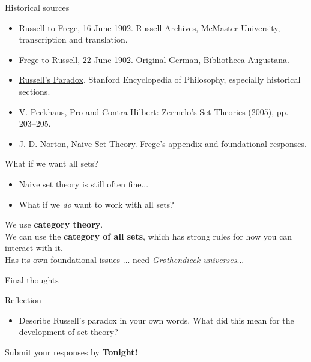 \documentclass{beamer}
\begin{document}
\begin{frame}{Historical sources}
\small
\begin{itemize}
\item \href{https://bracers.mcmaster.ca/53946}{Russell to Frege, 16 June 1902}. Russell Archives, McMaster University, transcription and translation.
\item \href{https://www.tha.de/~harsch/germanica/Chronologie/19Jh/Frege/fre_brif.html}{Frege to Russell, 22 June 1902}. Original German, Bibliotheca Augustana.
\item \href{https://plato.stanford.edu/entries/russell-paradox/}{Russell's Paradox}. Stanford Encyclopedia of Philosophy, especially historical sections.
\item \href{https://www.numdam.org/item/PHSC_2005__9_S2_199_0.pdf}{V. Peckhaus, Pro and Contra Hilbert: Zermelo's Set Theories} (2005), pp. 203--205.
\item \href{https://sites.pitt.edu/~jdnorton/teaching/paradox/paradox_fall_2021/chapters/sets/sets.html}{J. D. Norton, Naive Set Theory}. Frege's appendix and foundational responses.
\end{itemize}
\end{frame}

\begin{frame}{What if we want all sets?}
\begin{itemize}
\item Naive set theory is still often fine...
\item What if we \emph{do} want to work with all sets?
\end{itemize}
We use \textbf{category theory}.\\
We can use the \textbf{category of all sets}, which has strong rules for how you can interact with it.\\
\medskip
Has its own foundational issues ... need \textit{Grothendieck universes}...
\end{frame}



\begin{frame}{Final thoughts}
  \begin{block}{Reflection}
\begin{itemize}
\item Describe Russell's paradox in your own words.  What did this mean for the development of set theory?
\end{itemize}
  \end{block}
\begin{center}
Submit your responses by \textbf{Tonight!}
\end{center}
\end{frame}
\end{document}
